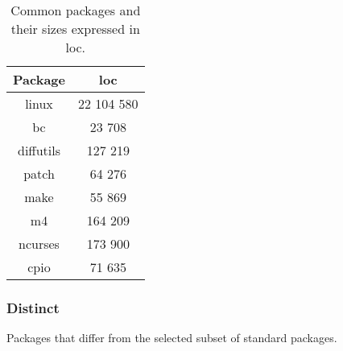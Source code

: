 \begin{table}[!h]
    \centering
    \begin{tabular}{|c||c|}
        \hline
        Package & \gls{loc} \\
        \hline
        \hline
        linux \cite{linux} & 22 104 580 \\
        \hline
        bc \cite{bc} & 23 708 \\
        \hline        
        diffutils \cite{diffutils} & 127 219 \\
        \hline
        patch \cite{patch} & 64 276 \\
        \hline
        make \cite{make} & 55 869 \\
        \hline
        m4 \cite{m4} & 164 209 \\
        \hline
        ncurses \cite{ncurses} & 173 900 \\
        \hline
        cpio \cite{cpio} & 71 635 \\
        \hline
    \end{tabular}
    \caption{Common packages and their sizes expressed in \gls{loc}.}
\end{table}

\newpage

\subsubsection{Distinct}

Packages that differ from the selected subset of standard packages.

